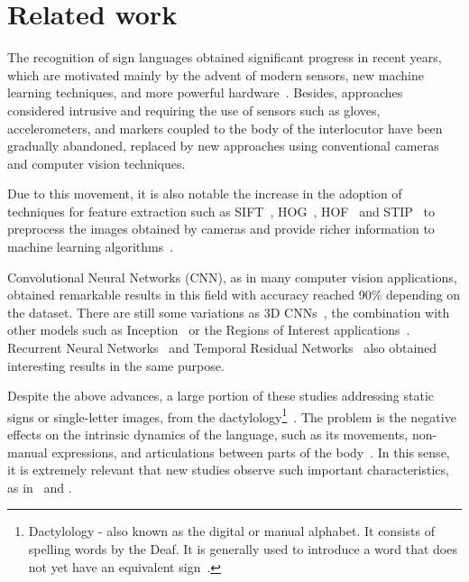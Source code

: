 
\section{Related work}
\label{sec:related-work}

The recognition of sign languages obtained significant progress in recent years, which are motivated mainly by the advent of modern sensors, new machine learning techniques, and more powerful hardware~\cite{recent-advances-dl-2017,recent-advances-sl-2013}. Besides, approaches considered intrusive and requiring the use of sensors such as gloves, accelerometers, and markers coupled to the body of the interlocutor have been gradually abandoned, replaced by new approaches using conventional cameras and computer vision techniques.

Due to this movement, it is also notable the increase in the adoption of techniques for feature extraction such as SIFT~\cite{lowe-2004}, HOG~\cite{dalal-2005}, HOF~\cite{laptev-2008} and STIP~\cite{laptev-2008} to preprocess the images obtained by cameras and provide richer information to machine learning algorithms~\cite{lim-2016,shanta-2018}.

Convolutional Neural Networks (CNN), as in many computer vision applications, obtained remarkable results in this field with accuracy reached 90\% \cite{shanta-2018,ji-2017,taskiran-2018,rao-2018} depending on the dataset. There are still some variations as 3D CNNs~\cite{elbadawy-2017}, the combination with other models such as Inception~\cite{das-2018} or the Regions of Interest applications~\cite{sajanraj-2018}. Recurrent Neural Networks~\cite{konstantinidis-2018} and Temporal Residual Networks~\cite{pigou-2017} also obtained interesting results in the same purpose.

Despite the above advances, a large portion of these studies addressing static signs or single-letter images, from the dactylology\footnote{Dactylology - also known as the digital or manual alphabet. It consists of spelling words by the Deaf. It is generally used to introduce a word that does not yet have an equivalent sign~\cite{quadros-2004,pereira-choi-2011}.
}~\cite{shanta-2018,taskiran-2018,elbadawy-2017,das-2018,sajanraj-2018}. The problem is the negative effects on the intrinsic dynamics of the language, such as its movements, non-manual expressions, and articulations between parts of the body~\cite{quadros-2004}. In this sense, it is extremely relevant that new studies observe such important characteristics, as in~\cite{konstantinidis-2018} and \cite {pigou-2017}.

